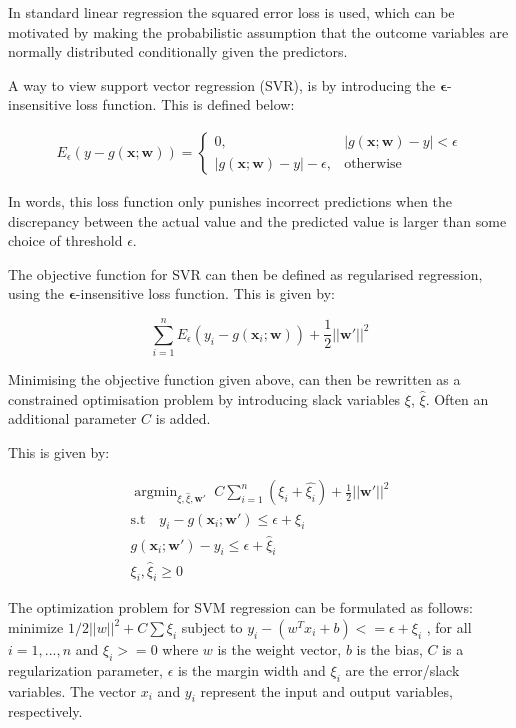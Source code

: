 \documentclass[11pt]{article}
\theoremstyle{definition}
\DeclareMathOperator*{\argmin}{argmin}
\newcommand{\bx}{\mathbf{x}}
\newcommand{\bw}{\mathbf{w}}
\begin{document}
In standard linear regression the squared error loss is used, which can be motivated by making the probabilistic assumption that the outcome variables are normally distributed conditionally given the predictors.

A way to view support vector regression (SVR), is by introducing the $\boldsymbol{\epsilon}$-insensitive loss function.  
This is defined below:

\begin{align} \label{eq:binary linear classifier}
    E_{\epsilon}(y - g(\bx;\bw)) =
     \begin{cases}
       0, \quad &|g(\bx;\bw) - y| < \epsilon
       \\
       |g(\bx;\bw) - y| - \epsilon, &\text{otherwise}
     \end{cases}
\end{align}

In words, this loss function only punishes incorrect predictions when the discrepancy between the actual value and the predicted value is larger than some choice of threshold $\epsilon$.

The objective function for SVR can then be defined as regularised regression, using the $\boldsymbol{\epsilon}$-insensitive loss function.  
This is given by:

\begin{equation}
\sum_{i = 1}^{n}{E_{\epsilon}(y_i - g(\bx_i;\bw))} + \frac{1}{2}||\bw'||^2    
\end{equation}



Minimising the objective function given above, can then be rewritten as a constrained optimisation problem by introducing slack variables $\xi$, $\hat{\xi}$. Often an additional parameter $C$ is added.

This is given by:


\begin{align}
\argmin_{\xi,\hat{\xi},\bw'} \; C{\sum_{i = 1}^{n}}{(\xi_i + \hat{\xi_i})} + \frac{1}{2}||\bw'||^2 \nonumber\\
\text{s.t} \quad y_i - g(\bx_i;\bw') \leq \epsilon + \xi_i \label{eq:SVR formulation}\\
g(\bx_i;\bw') - y_i \leq \epsilon + \hat{\xi}_i \nonumber\\
\xi_i, \hat{\xi}_i \geq 0 \nonumber
\end{align}

The optimization problem for SVM regression can be formulated as follows:
minimize $1/2||w||^2 + C \sum \xi_i$
subject to $y_i - (w^T x_i + b) <= \epsilon + \xi_i$ , for all $i = 1, ..., n$ and $\xi_i >= 0$
where $w$ is the weight vector, $b$ is the bias, $C$ is a regularization parameter, $\epsilon$ is the margin width and $\xi_i$ are the error/slack variables. The vector $x_i$ and $y_i$ represent the input and output variables, respectively.
\end{document}

